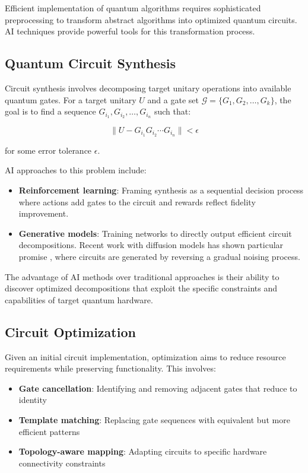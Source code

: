 Efficient implementation of quantum algorithms requires sophisticated preprocessing to transform abstract algorithms into optimized quantum circuits. AI techniques provide powerful tools for this transformation process.

\subsection{Quantum Circuit Synthesis}
Circuit synthesis involves decomposing target unitary operations into available quantum gates. For a target unitary $U$ and a gate set $\mathcal{G} = \{G_1, G_2, \ldots, G_k\}$, the goal is to find a sequence $G_{i_1}, G_{i_2}, \ldots, G_{i_n}$ such that:

\begin{equation}
\| U - G_{i_1} G_{i_2} \cdots G_{i_n} \| < \epsilon
\end{equation}

for some error tolerance $\epsilon$.

AI approaches to this problem include:

\begin{itemize}
    \item \textbf{Reinforcement learning}: Framing synthesis as a sequential decision process where actions add gates to the circuit and rewards reflect fidelity improvement.
    
    \item \textbf{Generative models}: Training networks to directly output efficient circuit decompositions. Recent work with diffusion models has shown particular promise \cite{furrutter2024quantum}, where circuits are generated by reversing a gradual noising process.
\end{itemize}

The advantage of AI methods over traditional approaches is their ability to discover optimized decompositions that exploit the specific constraints and capabilities of target quantum hardware.

\subsection{Circuit Optimization}
Given an initial circuit implementation, optimization aims to reduce resource requirements while preserving functionality. This involves:

\begin{itemize}
    \item \textbf{Gate cancellation}: Identifying and removing adjacent gates that reduce to identity
    
    \item \textbf{Template matching}: Replacing gate sequences with equivalent but more efficient patterns
    
    \item \textbf{Topology-aware mapping}: Adapting circuits to specific hardware connectivity constraints
\end{itemize}

